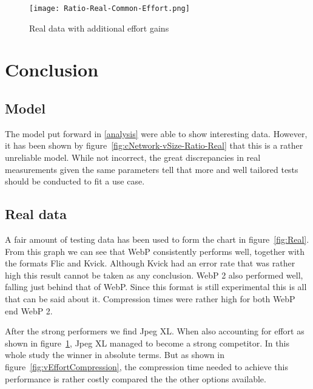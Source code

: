 \documentclass[11pt,a4paper]{report}
\begin{document}

\begin{figure}[!htb]
\centering
\texttt{[image: Ratio-Real-Common-Effort.png]}
\caption{\label{fig:vEffortReal} Real data with additional effort gains}
\end{figure}

\newpage

\chapter{Conclusion}


\section{Model}

The model put forward in \ref{analysis} were able to show interesting data. However, it has been shown by figure~\ref{fig:cNetwork-vSize-Ratio-Real} that this is a rather unreliable model. While not incorrect, the great discrepancies in real measurements given the same parameters tell that more and well tailored tests should be conducted to fit a use case.

\section{Real data}

A fair amount of testing data has been used to form the chart in figure~\ref{fig:Real}. From this graph we can see that WebP consistently performs well, together with the formats Flic and Kvick. Although Kvick had an error rate that was rather high this result cannot be taken as any conclusion. WebP 2 also performed well, falling just behind that of WebP. Since this format is still experimental this is all that can be said about it. Compression times were rather high for both WebP end WebP 2.

After the strong performers we find Jpeg XL. When also accounting for effort as shown in figure~\ref{fig:vEffortReal}, Jpeg XL managed to become a strong competitor. In this whole study the winner in absolute terms. But as shown in figure~\ref{fig:vEffortCompression}, the compression time needed to achieve this performance is rather costly compared the the other options available.
\end{document}

